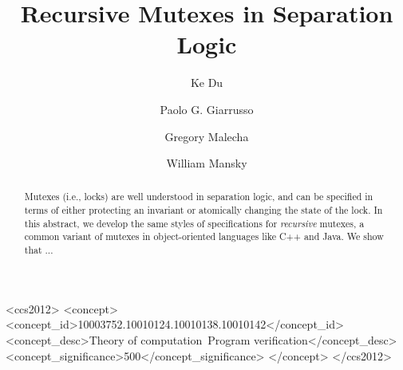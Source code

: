 \documentclass[sigplan,screen]{acmart}
\begin{document}
\title{Recursive Mutexes in Separation Logic}

\author{Ke Du}

\author{Paolo G. Giarrusso}

\author{Gregory Malecha}

\author{William Mansky}

\renewcommand{\shortauthors}{Du et al.}

\newcommand{\mutexR}{\ensuremath{\mathsf{rmutex}}}

\begin{abstract}
Mutexes (i.e., locks) are well understood in separation logic, and can be specified in terms of either protecting an invariant or atomically changing the state of the lock. In this abstract, we develop the same styles of specifications for \emph{recursive} mutexes, a common variant of mutexes in object-oriented languages like C++ and Java. We show that ...
\end{abstract}

\begin{CCSXML}
<ccs2012>
<concept>
<concept_id>10003752.10010124.10010138.10010142</concept_id>
<concept_desc>Theory of computation~Program verification</concept_desc>
<concept_significance>500</concept_significance>
</concept>
</ccs2012>
\end{CCSXML}
\end{document}
